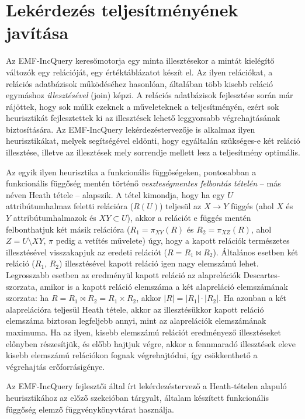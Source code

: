 
\section{Lekérdezés teljesítményének javítása}
\label{sect:caseStudy}

Az EMF-IncQuery keresőmotorja egy minta illesztésekor a mintát kielégítő változók egy relációját, egy értéktáblázatot készít el.
Az ilyen relációkat, a relációs adatbázisok működéséhez hasonlóan, általában több kisebb reláció egymáshoz \emph{illesztésével} (join) képzi.
A relációs adatbázisok fejlesztése során már rájöttek, hogy sok múlik ezeknek a műveleteknek a teljesítményén, ezért sok heurisztikát fejlesztettek ki az illesztések lehető leggyorsabb végrehajtásának biztosítására.
Az EMF-IncQuery lekérdezéstervezője is alkalmaz ilyen heurisztikákat, melyek segítségével eldönti, hogy egyáltalán szükséges-e két reláció illesztése, illetve az illesztések mely sorrendje mellett lesz a teljesítmény optimális.

Az egyik ilyen heurisztika a funkcionális függőségeken, pontosabban a funkcionális függőség mentén történő \emph{veszteségmentes felbontás tételén} -- más néven Heath tétele -- alapszik.
A tétel kimondja, hogy ha egy $U$ attribútumhalmaz feletti relációra ($R(U)$) teljesül az $X \rightarrow Y$ függés (ahol $X$ és $Y$ attribútumhalmazok és $XY \subset U$), akkor a relációt e függés mentén felbonthatjuk két másik relációra ($R_1 = \pi_{XY}(R)$ és $R_2 = \pi_{XZ}(R)$, ahol $Z = U \setminus XY$, $\pi$ pedig a vetítés művelete) úgy, hogy a kapott relációk természetes illesztésével visszakapjuk az eredeti relációt ($R = R_1 \bowtie R_2$).
Általános esetben két reláció ($R_1$, $R_2$) illesztésével kapott reláció igen nagy elemszámú lehet.
Legrosszabb esetben az eredményül kapott reláció az alaprelációk Descartes-szorzata, amikor is a kapott reláció elemszáma a két alapreláció elemszámának szorzata: ha $R = R_1 \bowtie R_2 = R_1 \times R_2$, akkor $|R| = |R_1|\cdot|R_2|$.
Ha azonban a két alaprelációra teljesül Heath tétele, akkor az illesztésükkor kapott reláció elemszáma biztosan legfeljebb annyi, mint az alaprelációk elemszámának maximuma.
Ha az ilyen, kisebb elemszámú relációt eredményező illesztéseket előnyben részesítjük, és előbb hajtjuk végre, akkor a fennmaradó illesztések eleve kisebb elemszámú relációkon fognak végrehajtódni, így csökkenthető a végrehajtás erőforrásigénye.

Az EMF-IncQuery fejlesztői által írt lekérdezéstervező a Heath-tételen alapuló heurisztikához az előző szekcióban tárgyalt, általam készített funkcionális függőség elemző függvénykönyvtárat használja.

